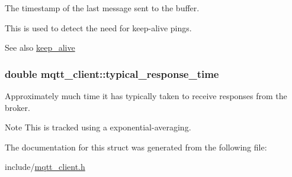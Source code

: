 The timestamp of the last message sent to the buffer. 

This is used to detect the need for keep-\/alive pings.

\begin{DoxySeeAlso}{See also}
\hyperlink{structmqtt__client_aff533344a060e58277698039f547147a}{keep\+\_\+alive} 
\end{DoxySeeAlso}
\subsubsection[{\texorpdfstring{typical\+\_\+response\+\_\+time}{typical_response_time}}]{\setlength{\rightskip}{0pt plus 5cm}double mqtt\+\_\+client\+::typical\+\_\+response\+\_\+time}\hypertarget{structmqtt__client_a4d1f8c7f4c364b07f75efcaf9613150e}{}\label{structmqtt__client_a4d1f8c7f4c364b07f75efcaf9613150e}


Approximately much time it has typically taken to receive responses from the broker. 

\begin{DoxyNote}{Note}
This is tracked using a exponential-\/averaging. 
\end{DoxyNote}


The documentation for this struct was generated from the following file\+:\begin{DoxyCompactItemize}
\item 
include/\hyperlink{mqtt__client_8h}{mqtt\+\_\+client.\+h}\end{DoxyCompactItemize}
